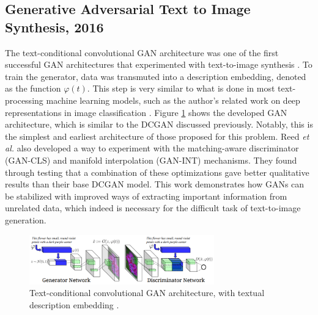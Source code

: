 \documentclass[letterpaper]{article} %
\begin{document}

\subsection{Generative Adversarial Text to Image Synthesis, 2016}
The text-conditional convolutional GAN architecture was one of the first 
successful GAN architectures that experimented with text-to-image synthesis 
\cite{gan_text_to_image}. To train the generator, data was transmuted into a 
description embedding, denoted as the function $\varphi(t)$. This step is 
very similar to what is done in most text-processing machine learning models, 
such as the author's related work on deep representations in image 
classification \cite{deep_visual_descriptions}. Figure \ref{fig:cond_gan} shows 
the developed GAN architecture, which is similar to 
the DCGAN discussed previously. Notably, this is the simplest and earliest 
architecture of those proposed for this problem. Reed \textit{et al.}
also developed a way to experiment with the matching-aware
discriminator (GAN-CLS) and manifold interpolation (GAN-INT) mechanisms. They 
found through testing that a combination of these optimizations gave better 
qualitative results than their base DCGAN model. This work demonstrates how 
GANs can be stabilized with improved ways of extracting important information 
from unrelated data, which indeed is necessary for the difficult task of 
text-to-image generation.

\begin{figure}[htbp]
\centerline{\includegraphics[width=8cm]{cond_gan.png}}
\caption{Text-conditional convolutional GAN architecture, with textual 
description embedding \cite{gan_text_to_image}.}
\label{fig:cond_gan}
\end{figure}

\end{document}
